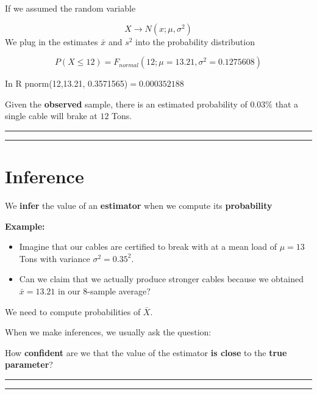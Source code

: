 \documentclass[
]{book}
\providecommand{\tightlist}{%
  \setlength{\itemsep}{0pt}\setlength{\parskip}{0pt}}
\begin{document}
If we assumed the random variable

\[X \rightarrow N(x; \mu, \sigma^2)\]
We plug in the estimates \(\bar{x}\) and \(s^2\) into the probability distribution

\[P(X \leq 12)= F_{normal}(12; \mu=13.21, \sigma^2=0.1275608)\]

In R pnorm(12,13.21, 0.3571565)\(=0.000352188\)

Given the \textbf{observed} sample, there is an estimated probability of \(0.03\%\) that a single cable will brake at \(12\) Tons.

\begin{center}\rule{0.5\linewidth}{0.5pt}\end{center}

\begin{center}\rule{0.5\linewidth}{0.5pt}\end{center}

\hypertarget{inference}{%
\section{Inference}\label{inference}}

We \textbf{infer} the value of an \textbf{estimator} when we compute its \textbf{probability}

\textbf{Example:}

\begin{itemize}
\tightlist
\item
  Imagine that our cables are certified to break with at a mean load of \(\mu = 13\) Tons with variance \(\sigma^2=0.35^2\).
\item
  Can we claim that we actually produce stronger cables because we obtained \(\bar{x}=13.21\) in our \(8\)-sample average?
\end{itemize}

We need to compute probabilities of \(\bar{X}\).

When we make inferences, we usually ask the question:

How \textbf{confident} are we that the value of the estimator \textbf{is close} to the \textbf{true parameter}?

\begin{center}\rule{0.5\linewidth}{0.5pt}\end{center}

\begin{center}\rule{0.5\linewidth}{0.5pt}\end{center}
\end{document}
